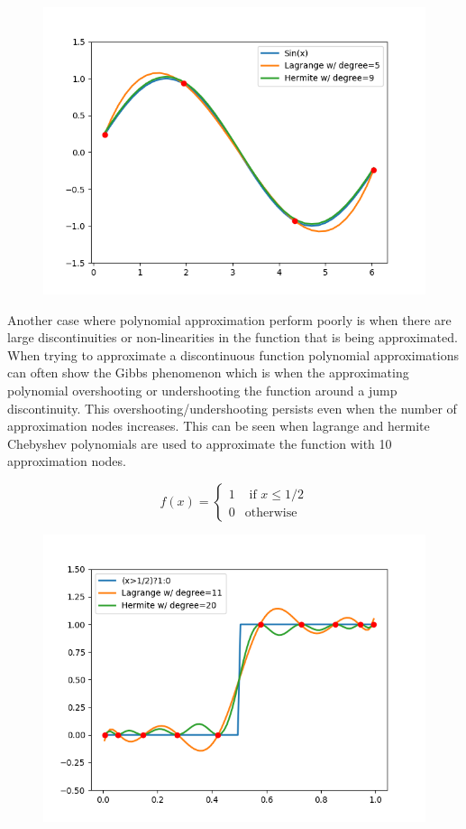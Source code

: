\documentclass[12pt]{article}
\begin{document}
\begin{figure}[H]
  \centering
  \includegraphics[scale=.8]{plot_Cheb_Sin_Func}
\end{figure}

Another case where polynomial approximation perform poorly is when there are large discontinuities or non-linearities in the function that is being approximated. When trying to approximate a discontinuous function polynomial approximations can often show the Gibbs phenomenon which is when the approximating polynomial overshooting or undershooting the function around a jump discontinuity. This overshooting/undershooting persists even when the number of approximation nodes increases. This can be seen when lagrange and hermite Chebyshev polynomials are used to approximate the function with 10 approximation nodes.

\begin{equation}
  \label{ind_func}
  f(x)=\begin{cases}
    1 & \text{ if } x\leq1/2\\
    0 & \text{otherwise}
  \end{cases}
\end{equation}

\begin{figure}[H]
  \centering
  \includegraphics[scale=.8]{plot_Cheb_Ind_Func}
\end{figure}
\end{document}
